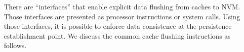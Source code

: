 There are ``interfaces'' that enable explicit data flushing %
from caches to NVM. Those interfaces are presented as processor instructions
or system calls. 
Using those interfaces, it is possible to enforce data consistence at
the persistence establishment point.
We discuss the common cache flushing instructions as follows. %

\begin{comment}
However, ensuring proper recovery requires constraints on
the ordering of NVRAM writes.  Existing DRAM intercon-
nects lack the interface to describe and enforce write ordering
constraints; ordering constraints that arise from memory con-
sistency requirements are usually enforced at the processor,
which is insufficient for failure tolerance with acceptable per-
formance. Recent work has suggested alternative interfaces to
enforce NVRAM write order and guarantee proper recovery,
for example, durable transactions and persist barriers.
\end{comment}

\begin{comment}
Memory persistency prescribes the order
of persist operations with respect to one another and loads and
stores, and allows the programmer to reason about guarantees
on the ordering of persists with respect to system failures;
memory persistency is an extension of consistency models
for persistent memory operations. The memory persistency
model relies on the underlying memory consistency model
and volatile memory execution to define persist ordering constraints
and the values written to persistent memory.
\end{comment}

\begin{comment}
Ensuring ordered data persistence is important for the OS
and applications. Storage devices usually provide an on-device
buffer and interface (“flush”) to write data in two phases – Data
is first written into the buffer, and upon an OS write barrier
(or the buffer is filled up), data is flushed from the buffer to
the medium.

With PM, it is similar but more complicated. Since PM
is physically managed by a memory controller and accessed
by the load/store interface, the written data may reside in
CPU caches. In other words, the CPU cache acts as a volatile
buffer for the PM. Applications, if not changed, may lose
data that is supposed to be persistent upon power failures.
\end{comment}

